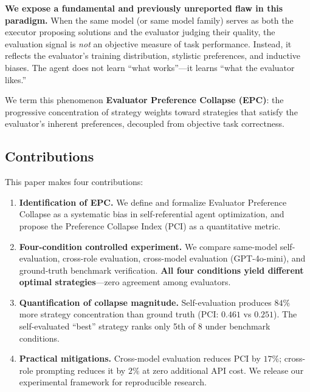 \documentclass[11pt,a4paper]{article}
\begin{document}
\textbf{We expose a fundamental and previously unreported flaw in this paradigm.} When the same model (or same model family) serves as both the executor proposing solutions and the evaluator judging their quality, the evaluation signal is \textit{not} an objective measure of task performance. Instead, it reflects the evaluator's training distribution, stylistic preferences, and inductive biases. The agent does not learn ``what works''---it learns ``what the evaluator likes.''

We term this phenomenon \textbf{Evaluator Preference Collapse (EPC)}: the progressive concentration of strategy weights toward strategies that satisfy the evaluator's inherent preferences, decoupled from objective task correctness.

\subsection{Contributions}

This paper makes four contributions:

\begin{enumerate}[leftmargin=*]
    \item \textbf{Identification of EPC.} We define and formalize Evaluator Preference Collapse as a systematic bias in self-referential agent optimization, and propose the Preference Collapse Index (PCI) as a quantitative metric.
    
    \item \textbf{Four-condition controlled experiment.} We compare same-model self-evaluation, cross-role evaluation, cross-model evaluation (GPT-4o-mini), and ground-truth benchmark verification. \textbf{All four conditions yield different optimal strategies}---zero agreement among evaluators.
    
    \item \textbf{Quantification of collapse magnitude.} Self-evaluation produces $84\%$ more strategy concentration than ground truth (PCI: $0.461$ vs $0.251$). The self-evaluated ``best'' strategy ranks only 5th of 8 under benchmark conditions.
    
    \item \textbf{Practical mitigations.} Cross-model evaluation reduces PCI by $17\%$; cross-role prompting reduces it by $2\%$ at zero additional API cost. We release our experimental framework for reproducible research.
\end{enumerate}

\end{document}
